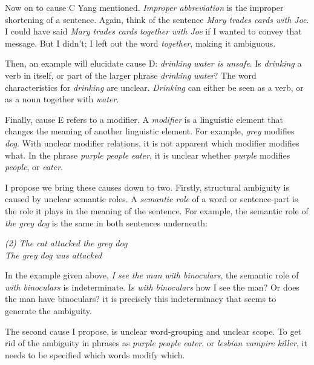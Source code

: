 Now on to cause C Yang mentioned. {\it Improper abbreviation} is the improper shortening of a sentence. Again, think of the sentence {\it Mary trades cards with Joe}. I could have said {\it Mary trades cards together with Joe} if I wanted to convey that message. But I didn't; I left out the word {\it together}, making it ambiguous. 

Then, an example will elucidate cause D: {\it drinking water is unsafe}. Is {\it drinking} a verb in itself, or part of the larger phrase {\it drinking water}? The word characteristics for {\it drinking} are unclear. {\it Drinking} can either be seen as a verb, or as a noun together with {\it water}.  

Finally, cause E refers to a modifier. A {\it modifier} is a linguistic element that changes the meaning of another linguistic element. For example, {\it grey} modifies {\it dog}. With unclear modifier relations, it is not apparent which modifier modifies what. In the phrase {\it purple people eater}, it is unclear whether {\it purple} modifies {\it people}, or {\it eater}.    


\noindent I propose we bring these causes down to two. Firstly, structural ambiguity is caused by unclear semantic roles. A {\it semantic role} of a word or sentence-part is the role it plays in the meaning of the sentence. For example, the semantic role of {\it the grey dog} is the same in both sentences underneath:



\begin{singlespace*}
	\begin{center}
	{\it (2) The cat attacked the grey dog}\\
	{\it The grey dog was attacked}
	\end{center}
\end{singlespace*}
\vspace{0.1cm}

\noindent In the example given above, {\it I see the man with binoculars}, the semantic role of {\it with binoculars} is indeterminate. Is {\it with binoculars} how I see the man? Or does the man have binoculars? it is precisely this indeterminacy that seems to generate the ambiguity.

The second cause I propose, is unclear word-grouping and unclear scope. To get rid of the ambiguity in phrases as {\it purple people eater}, or {\it lesbian vampire killer}, it needs to be specified which words modify which. 


